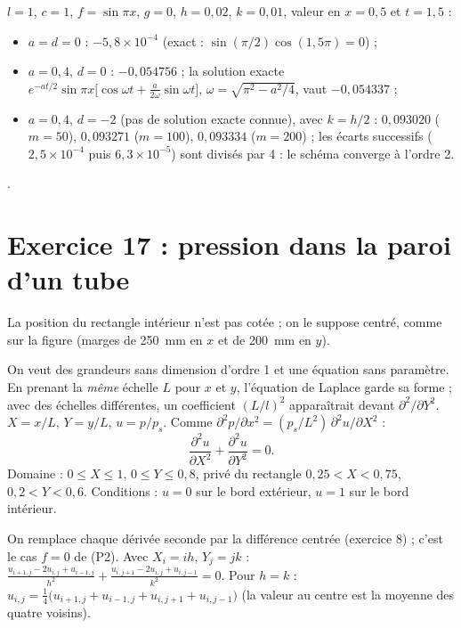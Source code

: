
\Verif $l = 1$, $c = 1$, $f = \sin\pi x$, $g = 0$, $h = 0{,}02$, $k = 0{,}01$,
valeur en $x = 0{,}5$ et $t = 1{,}5$ :
\begin{itemize}
  \item $a = d = 0$ : $-5{,}8\times 10^{-4}$ (exact : $\sin(\pi/2)\cos(1{,}5\pi) = 0$) ;
  \item $a = 0{,}4$, $d = 0$ : $-0{,}054756$ ; la solution exacte
        $e^{-at/2}\sin\pi x\bigl[\cos\omega t + \frac{a}{2\omega}\sin\omega t\bigr]$,
        $\omega = \sqrt{\pi^2 - a^2/4}$, vaut $-0{,}054337$ ;
  \item $a = 0{,}4$, $d = -2$ (pas de solution exacte connue), avec $k = h/2$ :
        $0{,}093020$ ($m = 50$), $0{,}093271$ ($m = 100$), $0{,}093334$
        ($m = 200$) ; les écarts successifs ($2{,}5\times 10^{-4}$ puis
        $6{,}3\times 10^{-5}$) sont divisés par 4 : le schéma converge à
        l'ordre 2.
\end{itemize}

\Refs {}.

\section{Exercice 17 : pression dans la paroi d'un tube}

\Attention La position du rectangle intérieur n'est pas cotée ; on le suppose
centré, comme sur la figure (marges de 250~mm en $x$ et de 200~mm en $y$).

\Pourquoi On veut des grandeurs sans dimension d'ordre 1 et une équation sans
paramètre. En prenant la \emph{même} échelle $L$ pour $x$ et $y$, l'équation de
Laplace garde sa forme ; avec des échelles différentes, un coefficient
$(L/l)^2$ apparaîtrait devant $\partial^2/\partial Y^2$.
\Etapes
{} $X = x/L$, $Y = y/L$, $u = p/p_s$. Comme
$\partial^2p/\partial x^2 = (p_s/L^2)\,\partial^2u/\partial X^2$ :
\[
  \frac{\partial^2u}{\partial X^2} + \frac{\partial^2u}{\partial Y^2} = 0 .
\]
 Domaine : $0 \le X \le 1$, $0 \le Y \le 0{,}8$, privé du rectangle
$0{,}25 < X < 0{,}75$, $0{,}2 < Y < 0{,}6$.
 Conditions : $u = 0$ sur le bord extérieur, $u = 1$ sur le bord
intérieur.

\Pourquoi On remplace chaque dérivée seconde par la différence centrée
(exercice 8) ; c'est le cas $f = 0$ de (P2).
 Avec $X_i = ih$, $Y_j = jk$ :
$\frac{u_{i+1,j} - 2u_{i,j} + u_{i-1,j}}{h^2} + \frac{u_{i,j+1} - 2u_{i,j} + u_{i,j-1}}{k^2} = 0$.
 Pour $h = k$ : $u_{i,j} = \frac14\bigl(u_{i+1,j} + u_{i-1,j} + u_{i,j+1} + u_{i,j-1}\bigr)$
(la valeur au centre est la moyenne des quatre voisins).

